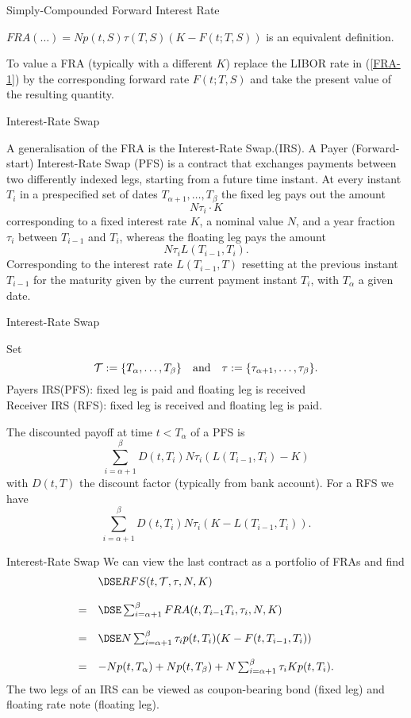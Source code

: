 {Simply-Compounded Forward Interest Rate}

\item<1-> $FRA(\ldots)=Np(t,S)\tau(T,S)(K-F(t; T,S))$ is an
equivalent definition.
\item<2-> To value a FRA (typically with a different $K$) replace the LIBOR rate in (\ref{FRA-1}) by
the corresponding forward rate $F(t;T,S)$ and take the present
value of the resulting quantity.


{Interest-Rate Swap}

A generalisation
of the FRA is the Interest-Rate Swap.(IRS). A Payer (Forward-start)
Interest-Rate Swap (PFS) is a contract that exchanges payments
between two differently indexed legs, starting from a future time
instant. At every instant $T_i$ in a prespecified set of dates
$T_{\alpha+1},\ldots ,T_{\beta}$ the fixed leg pays out the amount
$$
N\tau_i\cdot K
$$
corresponding to a fixed interest rate $K$, a
nominal value $N$, and a year fraction $\tau_i$ between $T_{i-1}$
and $T_i$, whereas the floating leg pays the amount
$$
N\tau_i L(T_{i-1},T_i).
$$
Corresponding to the interest rate
$L(T_{i-1},T)$ resetting at the previous instant $T_{i-1}$ for the
maturity given by the current payment instant $T_i$, with
$T_{\alpha}$ a given date.


{Interest-Rate Swap}

Set
$${\cal T}:=\{T_{\alpha},\ldots ,T_{\beta}\}\quad\mbox{and}\quad
\tau:=\{\tau_{\alpha+1},\ldots,\tau_{\beta}\}.
$$
Payers IRS(PFS):
fixed leg is paid and floating leg is received \\
Receiver IRS (RFS): fixed leg is received and floating leg is
paid.

The discounted payoff at time $t<T_{\alpha}$ of a PFS is
$$
\sum_{i=\alpha+1}^{\beta}D(t,T_i)N\tau_i(L(T_{i-1},T_i)-K)
$$
with $D(t,T)$ the discount factor (typically from bank account).
For a RFS we have
$$
\sum_{i=\alpha+1}^{\beta}D(t,T_i)N\tau_i(K-L(T_{i-1},T_i)).
$$

{Interest-Rate Swap}
We
can view the last contract as a portfolio of FRAs and find
$$
\begin{array}{ll}
& \DSE RFS(t,{\cal T},\tau,N,K) \\*[12pt] = & \DSE \sum_{i=\alpha+1}^{\beta}FRA(t,T_{i-1}T_i,\tau_i,N,K) \\*[12pt]
= & \DSE N\sum_{i=\alpha+1}^{\beta}\tau_i p(t,T_i)(K-F(t,T_{i-1},T_i))\\*[12pt]
= & -N   p(t,T_{\alpha})+Np(t,T_{\beta})+N\sum_{i=\alpha+1}^{\beta}\tau_i Kp(t,T_i).
\end{array}
$$
The two legs of an IRS can be viewed as
coupon-bearing bond (fixed leg) and floating rate note (floating
leg).


